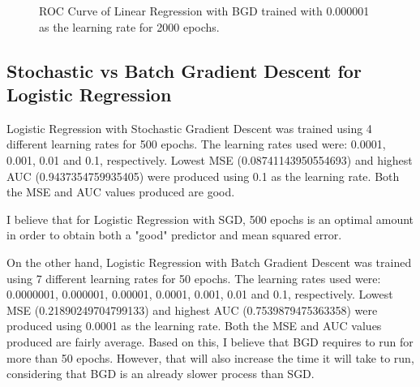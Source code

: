 \documentclass{article} %
\begin{document}
\begin{figure}[!htbp]
\begin{center}
\end{center}
\caption{ROC Curve of Linear Regression with BGD trained with 0.000001 as the learning rate for 2000 epochs.}
\label{Fig14}
\end{figure}

\subsection{Stochastic vs Batch Gradient Descent for Logistic Regression}

Logistic Regression with Stochastic Gradient Descent was trained using 4 different learning rates for 500 epochs. The learning rates used were: 0.0001, 0.001, 0.01 and 0.1, respectively. Lowest MSE (0.08741143950554693) and highest AUC (0.9437354759935405) were produced using 0.1 as the learning rate. Both the MSE and AUC values produced are good.

I believe that for Logistic Regression with SGD, 500 epochs is an optimal amount in order to obtain both a "good" predictor and mean squared error.

On the other hand, Logistic Regression with Batch Gradient Descent was trained using 7 different learning rates for 50 epochs. The learning rates used were: 0.0000001, 0.000001, 0.00001, 0.0001, 0.001, 0.01 and 0.1, respectively. Lowest MSE (0.21890249704799133) and highest AUC (0.7539879475363358) were produced using 0.0001 as the learning rate. Both the MSE and AUC values produced are fairly average. Based on this, I believe that BGD requires to run for more than 50 epochs. However, that will also increase the time it will take to run, considering that BGD is an already slower process than SGD.
\end{document}
